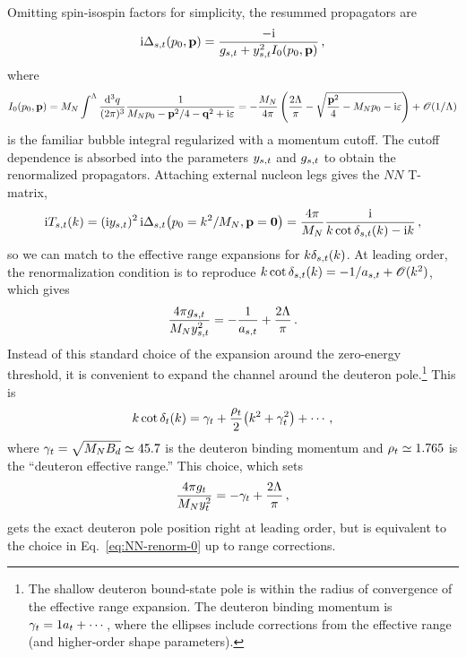 Omitting spin-isospin factors for simplicity, the resummed propagators are
%
\begin{equation}
 \mathrm{i}\Delta_{{s,t}}(p_0,{\mathbf{p}})
 = \frac{-\mathrm{i}}{g_{{s,t}} + y_{{s,t}}^2 I_0(p_0,{\mathbf{p}})} \,,
\end{equation}
%
where
%
\begin{multline}
 I_0(p_0,{\mathbf{p}}) = \MN\int^\Lambda \frac{\dd^3q}{(2\pi)^3}
 \frac{1}{\MN p_0 - {\mathbf{p}}^2/4 - \vq^2 + \ii\eps}
 = {-}\frac{\MN}{4\pi}
 \left(\frac{2\Lambda}{\pi} - \sqrt{\frac{{\mathbf{p}}^2}{4}-\MN p_0-\ii\eps}\right)
 +\OO(1/\Lambda)
\label{eq:I0-cutoff}
\end{multline}
%
is the familiar bubble integral regularized with a momentum cutoff.  The cutoff 
dependence is absorbed into the parameters $y_{{s,t}}$ and $g_{{s,t}}$ to obtain the 
renormalized propagators.  Attaching external nucleon legs gives the $NN$ 
T-matrix,
%
\begin{equation}
 \ii T_\st(k)
 = (\ii \yst)^2\, \ii\Delta_\st\!\left(p_0=k^2/\MN,{\mathbf{p}}=\vZero\right)
 = \frac{4\pi}{M_N}\frac{\ii}{k\cot\delta_\st(k) - \ii k}\,,
\label{eq:Tnd}
\end{equation}
%
so we can match to the effective range expansions for $k\delta_{{s,t}}(k)$.  At 
leading order, the renormalization condition is to reproduce
$k\cot\delta_{{s,t}}(k) = {-}1/{a_{{s,t}}} + \mathcal{O}(k^2)$, which gives
%
\begin{equation}
 \frac{4\pi\sigst}{\MN\yst^2} = {-}\frac{1}{a_\st} + \frac{2\Lambda}{\pi} \,.
\label{eq:NN-renorm-0}
\end{equation}
%
Instead of this standard choice of the expansion around the zero-energy 
threshold, it is convenient to expand the \ThreeSOne channel around the 
deuteron pole.\footnote{The shallow deuteron bound-state pole is within the 
radius of convergence of the effective range expansion. The deuteron binding 
momentum is $\gamma_t=1a_t + \cdots$, where the ellipses include corrections from 
the effective range (and higher-order shape parameters).}  This is
%
\begin{equation}
 k\cot\delta_t(k) = \gamma_t + \dfrac{\rho_t}2\big(k^2+\gamma_t^2\big) + \cdots \,,
\end{equation}
%
where $\gamma_t = \sqrt{\mathstrut M_N B_d}\simeq 45.7$ is the deuteron binding 
momentum and $\rho_t\simeq 1.765$ is the ``deuteron effective range.''  This 
choice, which sets
%
\begin{equation}
 \frac{4\pi\sigt}{\MN\yt^2} = {-}\gamt + \frac{2\Lambda}{\pi} \,,
\label{eq:NN-renorm-deut}
\end{equation}
%
gets the exact deuteron pole position right at leading order, but is equivalent 
to the choice in Eq.~\eqref{eq:NN-renorm-0} up to range corrections.

